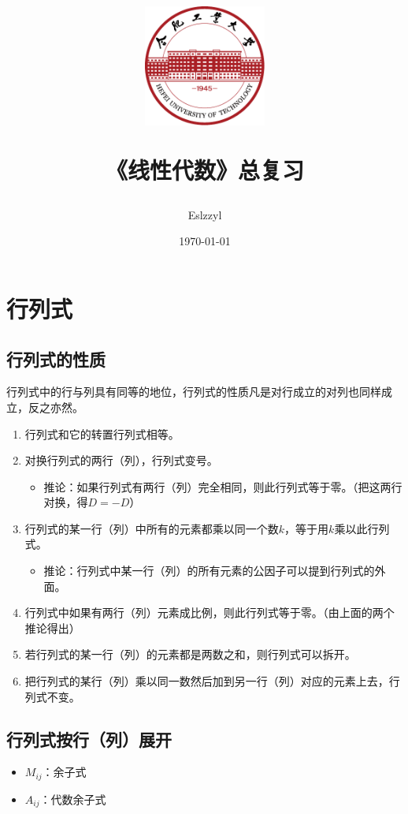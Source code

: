 \documentclass[12pt, a4paper, oneside]{ctexart}
\title{
    \includegraphics[width=0.3\textwidth]{images/hfut-badge.pdf}
    
    \vspace{20pt}
    《线性代数》总复习
}
\author{Eslzzyl}
\date{\today}
\begin{document}
\maketitle
\newpage
\tableofcontents
\vspace{20pt}

\newpage

\section{行列式}

\subsection{行列式的性质}

行列式中的行与列具有同等的地位，行列式的性质凡是对行成立的对列也同样成立，反之亦然。

\begin{enumerate}
  \item 行列式和它的转置行列式相等。
  \item 对换行列式的两行（列），行列式变号。
  \begin{itemize}
    \item 推论：如果行列式有两行（列）完全相同，则此行列式等于零。（把这两行对换，得$D=-D$）
  \end{itemize}
  \item 行列式的某一行（列）中所有的元素都乘以同一个数$k$，等于用$k$乘以此行列式。
  \begin{itemize}
    \item 推论：行列式中某一行（列）的所有元素的公因子可以提到行列式的外面。
  \end{itemize}
  \item 行列式中如果有两行（列）元素成比例，则此行列式等于零。（由上面的两个推论得出）
  \item 若行列式的某一行（列）的元素都是两数之和，则行列式可以拆开。
  \item 把行列式的某行（列）乘以同一数然后加到另一行（列）对应的元素上去，行列式不变。
\end{enumerate}

\subsection{行列式按行（列）展开}

\begin{itemize}
  \item $M_{ij}$：余子式
  \item $A_{ij}$：代数余子式
\end{itemize}
\end{document}
